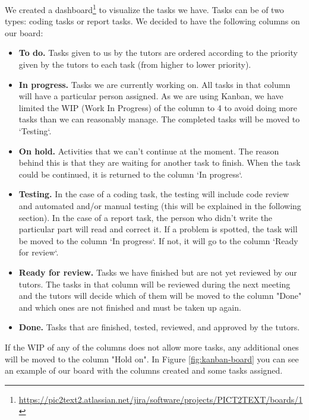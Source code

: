 We created a dashboard\footnote{\href{https://pic2text2.atlassian.net/jira/software/projects/PICT2TEXT/boards/1}{https://pic2text2.atlassian.net/jira/software/projects/PICT2TEXT/boards/1}} to visualize the tasks we have. Tasks can be of two types: coding tasks or report tasks. We decided to have the following columns on our board:
\begin{itemize}
\item \textbf{To do.} Tasks given to us by the tutors are ordered according to the priority given by the tutors to each task (from higher to lower priority).
\item \textbf{In progress.} Tasks we are currently working on. All tasks in that column will have a particular person assigned. As we are using Kanban, we have limited the WIP (Work In Progress) of the column to 4 to avoid doing more tasks than we can reasonably manage. The completed tasks will be moved to `Testing`.
\item \textbf{On hold.} Activities that we can't continue at the moment. The reason behind this is that they are waiting for another task to finish. When the task could be continued, it is returned to the column `In progress`.
\item \textbf{Testing.} In the case of a coding task, the testing will include code review and automated and/or manual testing (this will be explained in the following section). In the case of a report task, the person who didn't write the particular part will read and correct it. If a problem is spotted, the task will be moved to the column `In progress`. If not, it will go to the column `Ready for review`.
\item \textbf{Ready for review.}  Tasks we have finished but are not yet reviewed by our tutors. The tasks in that column will be reviewed during the next meeting and the tutors will decide which of them will be moved to the column "Done" and which ones are not finished and must be taken up again.
\item \textbf{Done.} Tasks that are finished, tested, reviewed, and approved by the tutors.
\end{itemize}

If the WIP of any of the columns does not allow more tasks, any additional ones will be moved to the column "Hold on". In Figure \ref{fig:kanban-board} you can see an example of our board with the columns created and some tasks assigned.

